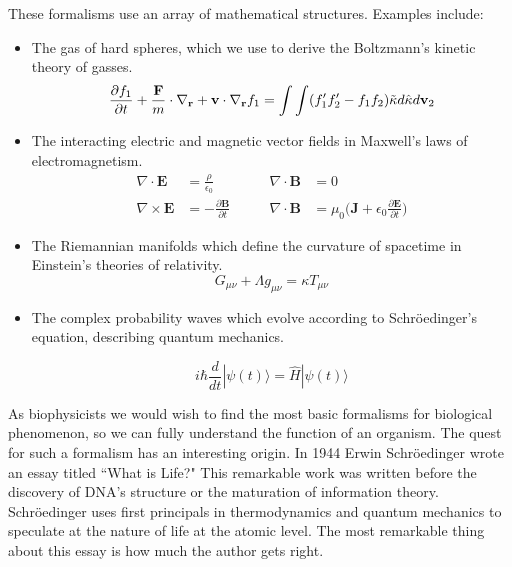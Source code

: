 These formalisms use an array of mathematical structures. Examples include:
\begin{itemize}
\item The gas of hard spheres, which we use to derive the Boltzmann's kinetic theory of gasses.  
\begin{equation}
	\label{hard_spheres}
	\frac{\partial f_1}{\partial t} + \frac{\bold{F}}{m}\cdot\nabla_\bold{r} + \bold{v} \cdot \nabla_\bold{r} f_1 =  \int \int (f'_1f'_2 - f_1 f_2) \tilde \kappa d \hat \kappa d \bold{v}_2
\end{equation}

\item The interacting electric and magnetic vector fields in Maxwell's laws of electromagnetism.
\begin{equation}
	\begin{aligned}
		\nabla \cdot  \mathbf{E} &= \frac{\rho}{\epsilon_0} \qquad & \nabla \cdot  \mathbf{B} &= 0 \\
		\nabla \times  \mathbf{E} &= -\frac{\partial \mathbf{B}}{\partial t} \qquad &  \nabla \cdot  \mathbf{B} &= \mu_0 \big(\mathbf{J} + \epsilon_0 \frac{\partial \mathbf{E} } {\partial t }\big)
	\end{aligned}
\end{equation}

\item The Riemannian manifolds which define the curvature of spacetime in Einstein's theories of relativity.
\begin{equation}
	G_{\mu \nu} + \Lambda g_{\mu \nu} = \kappa T_{\mu \nu}
\end{equation}

\item The complex probability waves which evolve according to Schr\"oedinger's equation, describing quantum mechanics. 

\begin{equation}
	i \hbar \frac{d}{dt} | \psi (t) \rangle = \hat {H} | \psi (t) \rangle 
\end{equation}
\end{itemize}

As biophysicists we would wish to find the most basic formalisms for biological phenomenon, so we can fully understand the function of an organism. The quest for such a formalism has an interesting origin. In 1944 Erwin Schr\"oedinger wrote an essay titled ``What is Life?" This remarkable work was written before the discovery of DNA's structure or the maturation of information theory. Schr\"oedinger uses first principals in thermodynamics and quantum mechanics to speculate at the nature of life at the atomic level. The most remarkable thing about this essay is how much the author gets right. 

